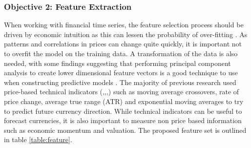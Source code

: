 \documentclass[11pt]{article}
\begin{document}
\subsubsection{Objective 2: Feature Extraction} 
When working with financial time series, the feature selection process should be driven by economic intuition as this can lessen the probability of over-fitting \cite{Arnott2018}. \newline As patterns and correlations in prices can change quite quickly, it is important not to overfit the model on the training data. A transformation of the data is also needed, with some findings suggesting that performing principal component analysis to create lower dimensional feature vectors is a good technique to use when constructing predictive models \cite{Song2010}. The majority of previous research used price-based technical indicators (\cite{Kara2011},\cite{Wang2014},\cite{Patel2015},\cite{Gunduz2017}) such as moving average crossovers, rate of price change, average true range (ATR) and exponential moving averages to try to predict future currency direction. While technical indicators can be useful to forecast currencies, it is also important to measure non price based information such as economic momentum and valuation. The proposed feature set is outlined in table \ref{table:feature}.
\begin{table}[h] 
\centering      %
\caption{Model Features} %
\label{table:feature} %
\end{table} 
\end{document}
